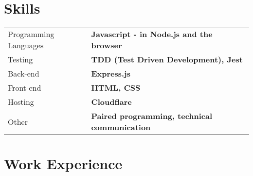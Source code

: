 \documentclass[a4paper,12pt]{article}
\begin{document}

\section{Skills}
\begin{tabularx}{\linewidth}{@{}l X@{}}
    Programming Languages & \textbf{Javascript - in Node.js and the browser}     \\
    Testing               & \textbf{TDD (Test Driven Development), Jest}         \\
    Back-end              & \textbf{Express.js}                                  \\
    Front-end             & \textbf{HTML, CSS}                                   \\
    Hosting               & \textbf{Cloudflare}                                  \\
    Other                 & \textbf{Paired programming, technical communication} \\%
\end{tabularx}


\section{Work Experience}
\end{document}
